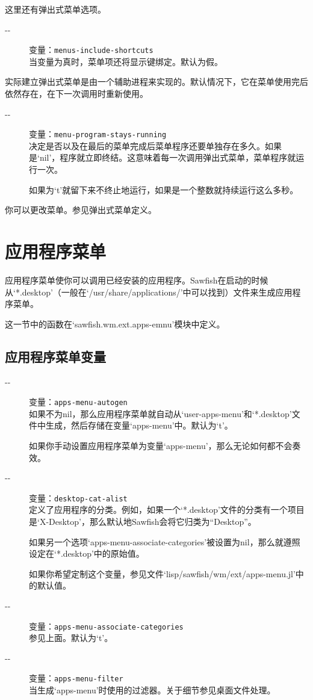 \documentclass{book}
\begin{document}
\begin{CJK*}{UTF8}{gbsn}
这里还有弹出式菜单选项。
\begin{description}
\item[-{}-] 变量：\verb|menus-include-shortcuts|\\
当变量为真时，菜单项还将显示键绑定。默认为假。
\end{description}

实际建立弹出式菜单是由一个辅助进程来实现的。默认情况下，它在菜单使用完后依然存在，在下一次调用时重新使用。
\begin{description}
\item[-{}-] 变量：\verb|menu-program-stays-running|\\
决定是否以及在最后的菜单完成后菜单程序还要单独存在多久。如果是`nil'，程序就立即终结。这意味着每一次调用弹出式菜单，菜单程序就运行一次。

如果为`t'就留下来不终止地运行，如果是一个整数就持续运行这么多秒。
\end{description}

你可以更改菜单。参见弹出式菜单定义。
\section{应用程序菜单}
应用程序菜单使你可以调用已经安装的应用程序。Sawfish在启动的时候从`*.desktop'（一般在`/usr/share/applications/'中可以找到）文件来生成应用程序菜单。

这一节中的函数在`sawfish.wm.ext.apps-emnu'模块中定义。
\subsection{应用程序菜单变量}
\begin{description}
\item[-{}-] 变量：\verb|apps-menu-autogen|\\
如果不为nil，那么应用程序菜单就自动从`user-apps-menu'和`*.desktop'文件中生成，然后存储在变量`apps-menu'中。默认为`t'。

如果你手动设置应用程序菜单为变量`apps-menu'，那么无论如何都不会奏效。
\item[-{}-] 变量：\verb|desktop-cat-alist|\\
定义了应用程序的分类。例如，如果一个`*.desktop'文件的分类有一个项目是`X-Desktop'，那么默认地Sawfish会将它归类为``Desktop''。

如果另一个选项`apps-menu-associate-categories'被设置为nil，那么就遵照设定在`*.desktop'中的原始值。

如果你希望定制这个变量，参见文件`lisp/sawfish/wm/ext/apps-menu.jl'中的默认值。
\item[-{}-] 变量：\verb|apps-menu-associate-categories|\\
参见上面。默认为`t'。
\item[-{}-] 变量：\verb|apps-menu-filter|\\
当生成`apps-menu'时使用的过滤器。关于细节参见桌面文件处理。


\end{description}
\end{CJK*}
\end{document}
